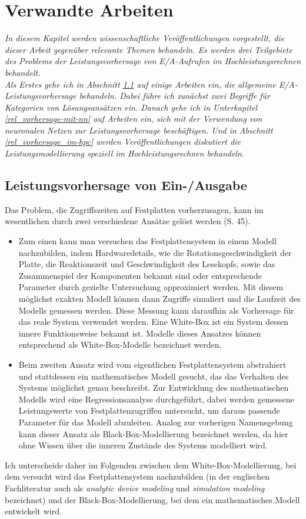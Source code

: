 \documentclass[
	12pt,
	a4paper,
	BCOR10mm,
	DIV14,
	listof=totoc,
	bibliography=totoc,
	headsepline
]{scrreprt}
\begin{document}
\chapter{Verwandte Arbeiten}
\textit{%
	In diesem Kapitel werden wissenschaftliche Veröffentlichungen vorgestellt, die dieser Arbeit gegenüber relevante Themen behandeln. Es werden drei Teilgebiete des Problems der Leistungsvorhersage von E/A-Aufrufen im Hochleistungsrechnen behandelt.\\
	Als Erstes gehe ich in Abschnitt \ref{rel_ea-vorhersage} auf einige Arbeiten ein, die allgemeine E/A-Leistungsvorhersage behandeln. Dabei führe ich zunächst zwei Begriffe für Kategorien von Lösungsansätzen ein. Danach gehe ich in Unterkapitel \ref{rel_vorhersage-mit-nn} auf Arbeiten ein, sich mit der Verwendung von neuronalen Netzen zur Leistungsvorhersage beschäftigen.
	Und in Abschnitt \ref{rel_vorhersage_im-hpc} werden Veröffentlichungen diskutiert die Leistungsmodellierung speziell im Hochleistungsrechnen behandeln.
}
\bigskip

\section{Leistungsvorhersage von Ein-/Ausgabe}
\label{rel_ea-vorhersage}
Das Problem, die Zugriffszeiten auf Festplatten vorherzusagen, kann im wesentlichen durch zwei verschiedene Ansätze gelöst werden \cite{Crume:2013:FML:2538542.2538561} (S. 45).
\begin{itemize}
\item  Zum einen kann man versuchen das Festplattensystem in einem Modell nachzubilden, indem Hardwaredetails, wie die Rotationsgeschwindigkeit der Platte, die Reaktionszeit und Geschwindigkeit des Lesekopfs, sowie das Zusammenspiel der Komponenten bekannt sind oder entsprechende Parameter durch gezielte Untersuchung approximiert werden. Mit diesem möglichst exakten Modell können dann Zugriffe simuliert und die Laufzeit des Modells gemessen werden. Diese Messung kann daraufhin als Vorhersage für das reale System verwendet werden. Eine White-Box ist ein System dessen innere Funktionsweise bekannt ist. Modelle dieses Ansatzes können entsprechend als White-Box-Modelle bezeichnet werden.
\item Beim zweiten Ansatz wird vom eigentlichen Festplattensystem abstrahiert und stattdessen ein mathematisches Modell gesucht, das das Verhalten des Systems möglichst genau beschreibt.
Zur Entwicklung des mathematischen Modells wird eine Regressionsanalyse durchgeführt, dabei werden gemessene Leistungswerte von Festplattenzugriffen untersucht, um daraus passende Parameter für das Modell abzuleiten. Analog zur vorherigen Namensgebung kann dieser Ansatz als Black-Box-Modellierung bezeichnet werden, da hier ohne Wissen über die inneren Zustände des Systems modelliert wird.
\end{itemize}
Ich unterscheide daher im Folgenden zwischen dem White-Box-Modellierung, bei dem versucht wird das Festplattensystem nachzubilden (in der englischen Fachliteratur auch als \textit{analytic device modeling} und \textit{simulation modeling} bezeichnet) und der Black-Box-Modellierung, bei dem ein mathematisches Modell entwickelt wird.
\end{document}
